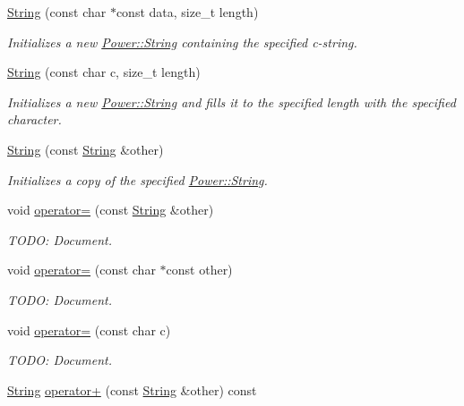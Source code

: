 \begin{DoxyCompactItemize}
\hyperlink{class_power_1_1_string_a01efecde6ea0a7f3f37750a4a1b15dcd}{String} (const char $\ast$const data, size\+\_\+t length)
\begin{DoxyCompactList}\small\item\em Initializes a new \hyperlink{class_power_1_1_string}{Power\+::\+String} containing the specified c-\/string. \end{DoxyCompactList}\item 
\hyperlink{class_power_1_1_string_a0ce03af511b7bb4a34b644fd7c9c2455}{String} (const char c, size\+\_\+t length)
\begin{DoxyCompactList}\small\item\em Initializes a new \hyperlink{class_power_1_1_string}{Power\+::\+String} and fills it to the specified length with the specified character. \end{DoxyCompactList}\item 
\hyperlink{class_power_1_1_string_adfe9fa7f75d91211013f408396615d32}{String} (const \hyperlink{class_power_1_1_string}{String} \&other)
\begin{DoxyCompactList}\small\item\em Initializes a copy of the specified \hyperlink{class_power_1_1_string}{Power\+::\+String}. \end{DoxyCompactList}\item 
void \hyperlink{class_power_1_1_string_ac0ec7adf5e627919b560ce591add0644}{operator=} (const \hyperlink{class_power_1_1_string}{String} \&other)
\begin{DoxyCompactList}\small\item\em T\+O\+DO\+: Document. \end{DoxyCompactList}\item 
void \hyperlink{class_power_1_1_string_abf5f2db360bf2c1853bccfcc8e2d3225}{operator=} (const char $\ast$const other)
\begin{DoxyCompactList}\small\item\em T\+O\+DO\+: Document. \end{DoxyCompactList}\item 
void \hyperlink{class_power_1_1_string_afca363999008481eb546192d24f8c9c1}{operator=} (const char c)
\begin{DoxyCompactList}\small\item\em T\+O\+DO\+: Document. \end{DoxyCompactList}\item 
\hyperlink{class_power_1_1_string}{String} \hyperlink{class_power_1_1_string_a570430069e83e0421ccdfb3cddc8a899}{operator+} (const \hyperlink{class_power_1_1_string}{String} \&other) const

\end{DoxyCompactItemize}
